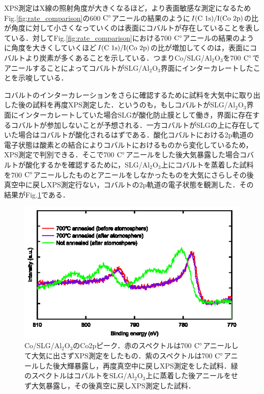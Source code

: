 {XPS測定はX線の照射角度が大きくなるほど，より表面敏感な測定になるためFig.\ref{fig:rate_comparison}の600$\rm\ C^{\circ}$アニールの結果のように$I(\rm C\ 1s)/I(\rm Co\ 2p)$の比が角度に対して小さくなっていくのは表面にコバルトが存在していることを表している．対してFig.\ref{fig:rate_comparison}における700$\rm\ C^{\circ}$アニールの結果のように角度を大きくしていくほど$I(\rm C\ 1s)/I(\rm Co\ 2p)$の比が増加してくのは，表面にコバルトより炭素が多くあることを示している．つまりCo/SLG/Al$_{2}$O$_{3}$を700$\rm\ C^{\circ}$でアニールすることによってコバルトがSLG/Al$_{2}$O$_{3}$界面にインターカレートしたことを示唆している．

コバルトのインターカレーションをさらに確認するために試料を大気中に取り出した後の試料を再度XPS測定した．というのも，もしコバルトがSLG/Al$_{2}$O$_{3}$界面にインターカレートしていた場合SLGが酸化防止膜として働き，界面に存在するコバルトが参加しないことが予想される．一方コバルトがSLGの上に存在していた場合はコバルトが酸化されるはずである．酸化コバルトにおける2p軌道の電子状態は酸素との結合によりコバルトにおけるものから変化しているため，XPS測定で判別できる．そこで700$\rm\ C^{\circ}$アニールをした後大気暴露した場合コバルトが酸化するかを確認するために，SLG/Al$_{2}$O$_{3}$上にコバルトを蒸着した試料を700$\rm\ C^{\circ}$アニールしたものとアニールをしなかったものを大気にさらしその後真空中に戻しXPS測定行ない，コバルトの2p軌道の電子状態を観測した．その結果がFig.\ref{fig:atom_comparison}である．

\begin{figure}[htbp]
\centerline{
\includegraphics[width=12cm]{images/atom_comparison.eps}
}
\caption{Co/SLG/Al$_{2}$O$_{3}$のCo2pピーク．赤のスペクトルは700$\rm\ C^{\circ}$アニールして大気に出さずXPS測定をしたもの．紫のスペクトルは700$\rm\ C^{\circ}$アニールした後大輝暴露し，再度真空中に戻しXPS測定をした試料．緑のスペクトルはコバルトをSLG/Al$_{2}$O$_{3}$上に蒸着した後アニールをせず大気暴露し，その後真空に戻しXPS測定した試料．
}
\label{fig:atom_comparison} 
\end{figure}

}
